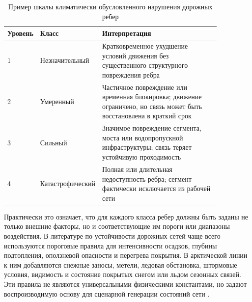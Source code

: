 \begin{table}[ht]
\centering
\caption{Пример шкалы климатически обусловленного нарушения дорожных ребер}
\label{tab:road-severity-scale}
\begin{tabular}{p{0.10\linewidth} p{0.18\linewidth} p{0.58\linewidth}}
\hline
\textbf{Уровень} & \textbf{Класс} & \textbf{Интерпретация} \\
\hline
1 & Незначительный & Кратковременное ухудшение условий движения без существенного структурного повреждения ребра \\
\hline
2 & Умеренный & Частичное повреждение или временная блокировка; движение ограничено, но связь может быть восстановлена в краткий срок \\
\hline
3 & Сильный & Значимое повреждение сегмента, моста или водопропускной инфраструктуры; связь теряет устойчивую проходимость \\
\hline
4 & Катастрофический & Полная или длительная недоступность ребра; сегмент фактически исключается из рабочей сети \\
\hline
\end{tabular}
\end{table}

Практически это означает, что для каждого класса ребер должны быть заданы
не только внешние факторы, но и соответствующие им пороги или диапазоны
воздействия. В литературе по устойчивости дорожных сетей чаще всего используются
пороговые правила для интенсивности осадков, глубины подтопления,
оползневой опасности и перегрева покрытия. В арктической линии к ним
добавляются снежные заносы, метели, ледовая обстановка, штормовые условия,
видимость и состояние покрытых снегом или льдом сезонных связей. Эти
правила не являются
универсальными физическими константами, но задают воспроизводимую основу
для сценарной генерации состояний сети
\cite{pregnolato2017pluvialFlooding,dottori2016floodHazard,
gariano2016landslides,khan2018asphaltTemperature,
wei2022coastalTrafficResilience,waite2023arcticTransport,
dong2025iceRoads,povoroznyuk2022arcticRoads,
touloumidis2025weatherDisruptions,burbidge2024aviationClimate}.

